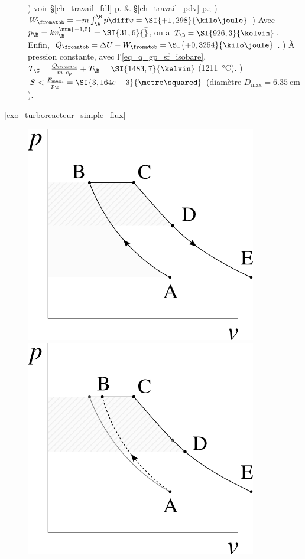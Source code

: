 \begin{description}
						) voir \S\ref{ch_travail_fdl} p.\pageref{ch_travail_fdl} \& \S\ref{ch_travail_pdv} p.\pageref{ch_travail_pdv};
					 	) $W_{\fromatob} = - m \int_\A^\B p \diff v = \SI{+1,298}{\kilo\joule}$ 	
						) Avec $p_\B = k v_\B^{\num{-1,5}} = \SI{31,6}{\bar}$, on a $T_\B = \SI{926,3}{\kelvin}$. Enfin, $Q_{\fromatob} = \Delta U - W_{\fromatob} = \SI{+0,3254}{\kilo\joule}$.
						) À pression constante, avec l’\cref{eq_q_gp_sf_isobare},  $T_\C = \frac{Q_\frombtoc}{m \ c_p} + T_\B = \SI{1483,7}{\kelvin}$ (\SI{1211}{\degreeCelsius}).
						) $S < \frac{F_\text{max.}}{p_\C} = \SI{3,164e-3}{\metre\squared}$ (diamètre $D_\text{max} = \SI{6,35}{\centi\metre}$).
	\item [\ref{exo_turboreacteur_simple_flux}]
						\includegraphics[width=\solutiondiagramwidth]{images/exo_sol_pv_turbojet_1.png}
						\includegraphics[width=\solutiondiagramwidth]{images/exo_sol_pv_turbojet_2.png}

\end{description}
